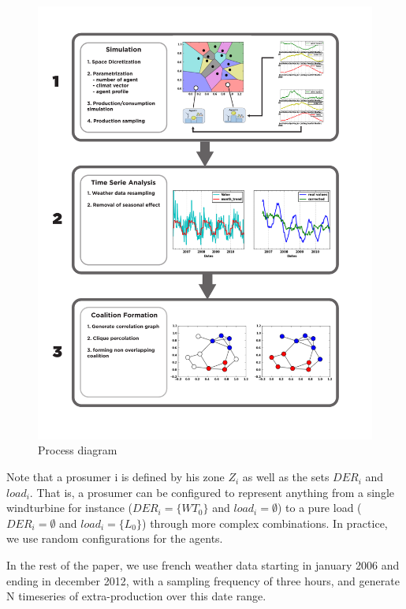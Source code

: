 \documentclass[conference]{IEEEtran}
\begin{document}
\begin{figure}
\includegraphics[scale=.45]{Fig2.pdf}
\caption{Process diagram}
\label{fig:process}
\end{figure}

Note that a prosumer i is defined by his zone $ Z_{i} $ as well as the sets $ DER_{i} $ and $ load_{i} $. That is, a prosumer can be configured to represent anything from a single windturbine for instance ($ DER_{i} = \{ WT_{0} \} $ and $ load_{i} = \emptyset $) to a pure load ($ DER_{i} = \emptyset $ and $ load_{i} = \{ L_{0} \} $) through more complex combinations. In practice, we use random configurations for the agents.

In the rest of the paper, we use french weather data \cite{Infoclimat} starting in january 2006 and ending in december 2012, with a sampling frequency of three hours, and generate N timeseries of extra-production over this date range.



%
%
\end{document}
